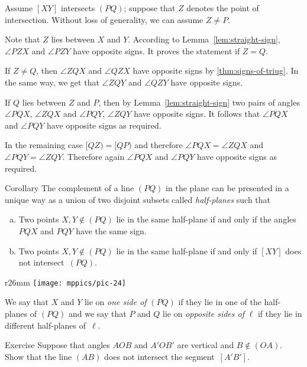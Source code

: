 Assume $[XY]$ intersects $(PQ)$;
suppose that $Z$ denotes the point of intersection.
Without loss of generality, we can assume $Z\ne P$.

Note that $Z$ lies between $X$ and $Y$.
According to Lemma~\ref{lem:straight-sign}, $\angle PZX$ and $\angle PZY$ have opposite signs.
It proves the statement if $Z=Q$.

If $Z\ne Q$, then $\angle ZQX$ and $\angle QZX$ have opposite signs by \ref{thm:signs-of-triug}.
In the same way, we get that $\angle ZQY$ and $\angle QZY$ have opposite signs.

If $Q$ lies between $Z$ and $P$, then by Lemma~\ref{lem:straight-sign} two pairs of angles $\angle PQX$, $\angle ZQX$ and $\angle PQY$, $\angle ZQY$ have opposite signs. 
It follows that $\angle PQX$ and $\angle PQY$ have opposite signs as required.

In the remaining case $[QZ)=[QP)$ and therefore $\angle PQX=\angle ZQX$ and $\angle PQY=\angle ZQY$. 
Therefore again $\angle PQX$ and $\angle PQY$ have opposite signs as required.
\qeds

\begin{thm}[\abs]{Corollary}\label{cor:half-plane}
The complement of a line $(PQ)$ in the plane 
can be presented in a unique way as a union of two disjoint subsets 
called \emph{half-planes}
such that 
\begin{enumerate}[(a)]
\item\label{cor:half-plane:angle} Two points $X,Y\notin(PQ)$ lie in the same half-plane if and only if the angles $PQX$ and $PQY$ have the same sign.
\item\label{cor:half-plane:intersect} Two points $X,Y\notin(PQ)$ lie in the same half-plane if and only if $[XY]$ does not intersect~$(PQ)$.
\end{enumerate}

\end{thm}

{

\begin{wrapfigure}{r}{26mm}
\vskip-4mm
\centering
\texttt{[image: mppics/pic-24]}
\end{wrapfigure}

We say that $X$ and $Y$ lie on {}\emph{one side of} $(PQ)$ if they lie in one of the half-planes of $(PQ)$ and we say that  $P$ and $Q$ lie on {}\emph{opposite sides of} $\ell$ if they lie in different half-planes of~$\ell$.


\begin{thm}{Exercise}\label{ex:vert-intersect}
Suppose that angles $AOB$ and $A'OB'$ are vertical and $B\notin (OA)$.
Show that the line $(AB)$ does not intersect the segment~$[A'B']$.
\end{thm}

}

